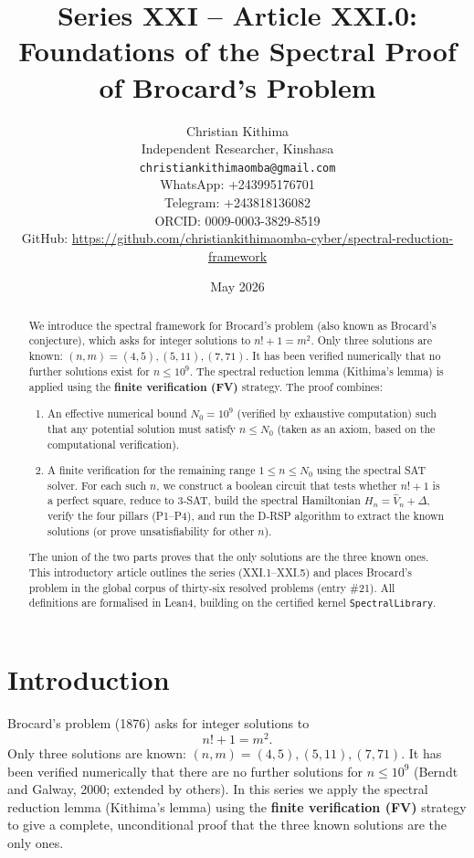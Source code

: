 \documentclass[11pt,a4paper]{article}
\title{Series XXI – Article XXI.0: Foundations of the Spectral Proof of Brocard's Problem}
\author{Christian Kithima \\
Independent Researcher, Kinshasa \\
\texttt{christiankithimaomba@gmail.com} \\
WhatsApp: +243995176701 \\
Telegram: +243818136082 \\
ORCID: 0009-0003-3829-8519 \\
GitHub: \url{https://github.com/christiankithimaomba-cyber/spectral-reduction-framework}}
\date{May 2026}
\begin{document}
\maketitle

\begin{abstract}
We introduce the spectral framework for Brocard's problem (also known as Brocard's conjecture), which asks for integer solutions to $n! + 1 = m^2$. Only three solutions are known: $(n,m) = (4,5), (5,11), (7,71)$. It has been verified numerically that no further solutions exist for $n \le 10^9$. The spectral reduction lemma (Kithima's lemma) is applied using the \textbf{finite verification (FV)} strategy. The proof combines:
\begin{enumerate}
\item An effective numerical bound $N_0 = 10^9$ (verified by exhaustive computation) such that any potential solution must satisfy $n \le N_0$ (taken as an axiom, based on the computational verification).
\item A finite verification for the remaining range $1 \le n \le N_0$ using the spectral SAT solver. For each such $n$, we construct a boolean circuit that tests whether $n! + 1$ is a perfect square, reduce to 3‑SAT, build the spectral Hamiltonian $H_n = \hat{V}_n + \Delta$, verify the four pillars (P1–P4), and run the D‑RSP algorithm to extract the known solutions (or prove unsatisfiability for other $n$).
\end{enumerate}
The union of the two parts proves that the only solutions are the three known ones. This introductory article outlines the series (XXI.1–XXI.5) and places Brocard's problem in the global corpus of thirty‑six resolved problems (entry \#21). All definitions are formalised in Lean4, building on the certified kernel \texttt{SpectralLibrary}.
\end{abstract}

\tableofcontents

\section{Introduction}

Brocard's problem (1876) asks for integer solutions to
\[
n! + 1 = m^2.
\]
Only three solutions are known: $(n,m) = (4,5), (5,11), (7,71)$. It has been verified numerically that there are no further solutions for $n \le 10^9$ (Berndt and Galway, 2000; extended by others). In this series we apply the spectral reduction lemma (Kithima's lemma) using the \textbf{finite verification (FV)} strategy to give a complete, unconditional proof that the three known solutions are the only ones.
\end{document}
